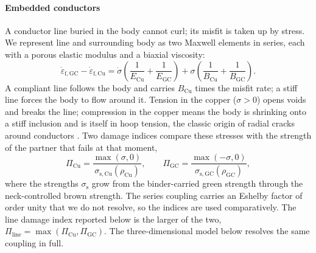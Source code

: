 \paragraph{Embedded conductors} A conductor line buried in the body cannot curl; its misfit is taken up by stress. We represent line and surrounding body as two Maxwell elements in series, each with a porous elastic modulus and a biaxial viscosity:
\begin{equation}
\dot{\varepsilon}_{\mathrm{f,GC}}-\dot{\varepsilon}_{\mathrm{f,Cu}} = \dot{\sigma}\left(\frac{1}{E_{\mathrm{Cu}}}+\frac{1}{E_{\mathrm{GC}}}\right)+\sigma\left(\frac{1}{B_{\mathrm{Cu}}}+\frac{1}{B_{\mathrm{GC}}}\right).
\label{eq:maxwell}
\end{equation}
A compliant line follows the body and carries $B_{\mathrm{Cu}}$ times the misfit rate; a stiff line forces the body to flow around it. Tension in the copper ($\sigma > 0$) opens voids and breaks the line; compression in the copper means the body is shrinking onto a stiff inclusion and is itself in hoop tension, the classic origin of radial cracks around conductors \cite{cai1997constrainedI,green2008constrained}. Two damage indices compare these stresses with the strength of the partner that fails at that moment,
\begin{equation}
\Pi_{\mathrm{Cu}} = \frac{\max(\sigma,0)}{\sigma_{\mathrm{s,Cu}}(\rho_{\mathrm{Cu}})},\qquad
\Pi_{\mathrm{GC}} = \frac{\max(-\sigma,0)}{\sigma_{\mathrm{s,GC}}(\rho_{\mathrm{GC}})},
\label{eq:damage}
\end{equation}
where the strengths $\sigma_{\mathrm{s}}$ grow from the binder-carried green strength through the neck-controlled brown strength. The series coupling carries an Eshelby factor of order unity \cite{eshelby1957determination} that we do not resolve, so the indices are used comparatively. The line damage index reported below is the larger of the two, $\Pi_{\mathrm{line}} = \max(\Pi_{\mathrm{Cu}},\Pi_{\mathrm{GC}})$. The three-dimensional model below resolves the same coupling in full.

